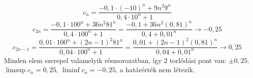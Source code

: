 \documentclass[11pt]{scrartcl}
\begin{document}
\[
	c_n = \frac{-0{,}1 \cdot (-10)^n + 9n^2 9^n}{0{,}4 \cdot 10^n + 1}
\]
\[
	c_{2n}
	= \frac{-0{,}1 \cdot 100^n + 36n^2 81^n}{0{,}4 \cdot 100^n + 1}
	= \frac{-0{,}1 + 36n^2 (0{,}81)^n}{0{,}4 + 0{,}01^n}
	\to -0{,}25
\]
\[
	c_{2n - 1}
	= \frac{0{,}01 \cdot 100^n + (2n - 1)^2 81^n}{0{,}04 \cdot 100^n + 1}
	= \frac{0{,}01 + (2n - 1)^2 (0{,}81)^n}{0{,}04 + 0{,}01^n}
	\to 0{,}25
\]
Minden elem szerepel valamelyik részsorozatban, így 2 torlódási pont van:
$\pm 0{,}25$. $\limsup c_n = 0{,}25$, $\liminf c_n = -0{,}25$, a határérték
nem létezik.
\end{document}
